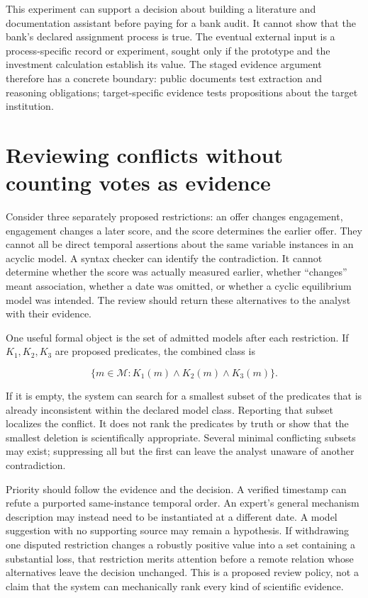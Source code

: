 This experiment can support a decision about building a literature and
documentation assistant before paying for a bank audit. It cannot show
that the bank's declared assignment process is true. The eventual
external input is a process-specific record or experiment, sought only
if the prototype and the investment calculation establish its value. The
staged evidence argument therefore has a concrete boundary: public
documents test extraction and reasoning obligations; target-specific
evidence tests propositions about the target institution.

\hypertarget{reviewing-conflicts-without-counting-votes-as-evidence}{%
\section{Reviewing conflicts without counting votes as
evidence}\label{reviewing-conflicts-without-counting-votes-as-evidence}}

Consider three separately proposed restrictions: an offer changes
engagement, engagement changes a later score, and the score determines
the earlier offer. They cannot all be direct temporal assertions about
the same variable instances in an acyclic model. A syntax checker can
identify the contradiction. It cannot determine whether the score was
actually measured earlier, whether ``changes'' meant association,
whether a date was omitted, or whether a cyclic equilibrium model was
intended. The review should return these alternatives to the analyst
with their evidence.

One useful formal object is the set of admitted models after each
restriction. If \(K_1,K_2,K_3\) are proposed predicates, the combined
class is

\[
 \{m\in\mathcal M:K_1(m)\land K_2(m)\land K_3(m)\}.
\]

If it is empty, the system can search for a smallest subset of the
predicates that is already inconsistent within the declared model class.
Reporting that subset localizes the conflict. It does not rank the
predicates by truth or show that the smallest deletion is scientifically
appropriate. Several minimal conflicting subsets may exist; suppressing
all but the first can leave the analyst unaware of another
contradiction.

Priority should follow the evidence and the decision. A verified
timestamp can refute a purported same-instance temporal order. An
expert's general mechanism description may instead need to be
instantiated at a different date. A model suggestion with no supporting
source may remain a hypothesis. If withdrawing one disputed restriction
changes a robustly positive value into a set containing a substantial
loss, that restriction merits attention before a remote relation whose
alternatives leave the decision unchanged. This is a proposed review
policy, not a claim that the system can mechanically rank every kind of
scientific evidence.

